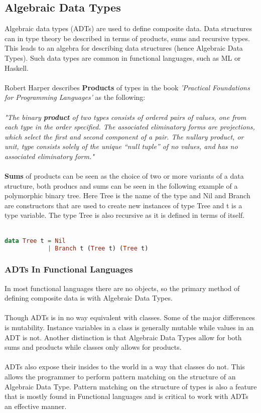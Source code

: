 \documentclass[10pt]{report}
\begin{document}
\subsection{Algebraic Data Types}
Algebraic data types (ADTs) are used to define composite data.  Data structures can in type theory be described in terms of products, sums and recursive types. This leads to an algebra for describing data structures (hence Algebraic Data Types). Such data types are common in functional languages, such as ML or Haskell.
\\
\\
Robert Harper describes \textbf{Products} of types in the book \textit{'Practical Foundations for Programming Languages'} as the following:
\\
\\
\textit{"The binary \textbf{product} of two types consists of ordered pairs of values, one from each type in the order specified. The associated eliminatory forms are projections, which select the first and second component of a pair. The nullary product, or unit, type consists solely of the unique “null tuple” of no values, and has no associated eliminatory form."}
\\
\\
\textbf{Sums} of products can be seen as the choice of two or more variants of a data structure, both producs and sums can be seen in the following example of a polymorphic binary tree.  Here Tree is the name of the type and Nil and Branch are constructors that are used to create new instances of type Tree and t is a type variable.  The type Tree is also recursive as it is defined in terms of itself.
\\
\\
\begin{lstlisting}[language=Haskell,caption={Binary tree definition in Haskell},label={lst:e4c_syntax}]
data Tree t = Nil
            | Branch t (Tree t) (Tree t)
\end{lstlisting}
\subsubsection{ADTs In Functional Languages}%
In most functional languages there are no objects, so the primary method of defining composite data is with Algebraic Data Types.
\\
\\
Though ADTs is in no way equivalent with classes. Some of the major differences is mutability. Instance variables in a class is generally mutable while values in an ADT is not. Another distinction is that Algebraic Data Types allow for both sums and products while classes only allows for products.
\\
\\
ADTs also expose their insides to the world in a way that classes do not. This allows the programmer to perform pattern matching on the structure of an Algebraic Data Type. Pattern matching on the structure of types is also a feature that is mostly found in Functional languages and is critical to work with ADTs an effective manner.
\end{document}

